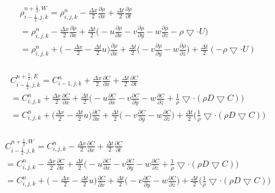 \documentclass{article}
\numberwithin{equation}{subsection}
\begin{document}
\begin{align}
\begin{split}
& \rho_{i-\frac{1}{2},j,k}^{n+\frac{1}{2}, W} = \rho_{i,j,k}^n - \frac{\Delta x}{2} \frac{\partial \rho}{\partial x} + \frac{\Delta t}{2} \frac{\partial \rho}{\partial t} \\
& = \rho_{i,j,k}^{n} - \frac{\Delta x}{2} \frac{\partial \rho}{\partial x} + \frac{\Delta t}{2} \Big( -u\frac{\partial \rho}{\partial x} - v\frac{\partial \rho}{\partial y} - w\frac{\partial \rho}{\partial z} - \rho \bigtriangledown \cdot U \Big) \\
& = \rho_{i,j,k}^{n} + \big( -\frac{\Delta x}{2} - \frac{\Delta t}{2}u\big)\frac{\partial \rho}{\partial x} + \frac{\Delta t}{2} \big( - v\frac{\partial \rho}{\partial y} - w\frac{\partial \rho}{\partial z} \big) + \frac{\Delta t}{2} (-\rho \bigtriangledown \cdot U)
\end{split}
\end{align}

\begin{align}
\begin{split}
& C_{i-\frac{1}{2},j,k}^{n+\frac{1}{2}, E} = C_{i-1,j,k}^n + \frac{\Delta x}{2} \frac{\partial C}{\partial x} + \frac{\Delta t}{2} \frac{\partial C}{\partial t} \\
&= C_{i,j,k}^{n} + \frac{\Delta x}{2} \frac{\partial C}{\partial x} + \frac{\Delta t}{2} \Big( -u\frac{\partial C}{\partial x} - v\frac{\partial C}{\partial y} - w\frac{\partial C}{\partial z} + \frac{1}{\rho} \bigtriangledown \cdot( \rho D \bigtriangledown C) \Big) \\
&= C_{i,j,k}^{n} + \Big( \frac{\Delta x}{2} - \frac{\Delta t}{2}u\Big)\frac{\partial C}{\partial x} + \frac{\Delta t}{2} \Big( -v\frac{\partial C}{\partial y} -w\frac{\partial C}{\partial z} \big) + \frac{\Delta t}{2} \Big( \frac{1}{\rho} \bigtriangledown \cdot( \rho D \bigtriangledown C)\Big)
\end{split}
\end{align}

\begin{align}
\begin{split}
& C_{i-\frac{1}{2},j,k}^{n+\frac{1}{2}, W} = C_{i,j,k}^n - \frac{\Delta x}{2} \frac{\partial C}{\partial x} + \frac{\Delta t}{2} \frac{\partial C}{\partial t} \\
&= C_{i,j,k}^{n} - \frac{\Delta x}{2} \frac{\partial C}{\partial x} + \frac{\Delta t}{2} \Big( -u\frac{\partial C}{\partial x} - v\frac{\partial C}{\partial y} - w\frac{\partial C}{\partial z} + \frac{1}{\rho} \bigtriangledown \cdot( \rho D \bigtriangledown C) \Big) \\
&= C_{i,j,k}^{n} + \Big( -\frac{\Delta x}{2} - \frac{\Delta t}{2}u\Big)\frac{\partial C}{\partial x} + \frac{\Delta t}{2} \Big( -v\frac{\partial C}{\partial y} -w\frac{\partial C}{\partial z} \big) + \frac{\Delta t}{2} \Big( \frac{1}{\rho} \bigtriangledown \cdot( \rho D \bigtriangledown C)\Big)\\ 
\end{split}
\end{align}
\end{document}
